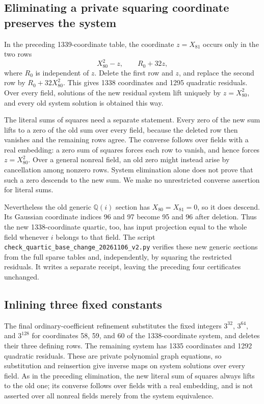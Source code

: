 \subsection{Eliminating a private squaring coordinate preserves the system}

In the preceding 1339-coordinate table, the coordinate
$z=X_{81}$ occurs only in the two rows
\[
                       X_{80}^2-z,
                         \qquad R_0+32z,
\]
where $R_0$ is independent of $z$.  Delete the first row and
$z$, and replace the second row by $R_0+32X_{80}^2$.
This gives 1338 coordinates and 1295 quadratic residuals.
Over every field, solutions of the new residual system lift
uniquely by $z=X_{80}^2$, and every old system solution is
obtained this way.

The literal sums of squares need a separate statement.
Every zero of the new sum lifts to a zero of the old sum
over every field, because the deleted row then vanishes and
the remaining rows agree.  The converse follows over fields
with a real embedding: a zero sum of squares forces each
row to vanish, and hence forces $z=X_{80}^2$.  Over a
general nonreal field, an old zero might instead arise by
cancellation among nonzero rows.  System elimination alone
does not prove that such a zero descends to the new sum.
We make no unrestricted converse assertion for literal sums.

Nevertheless the old generic $\mathbb Q(i)$ section has
$X_{80}=X_{81}=0$, so it does descend.  Its Gaussian
coordinate indices 96 and 97 become 95 and 96 after deletion.
Thus the new 1338-coordinate quartic, too, has input
projection equal to the whole field whenever $i$ belongs
to that field.  The script
\nolinkurl{check_quartic_base_change_20261106_v2.py}
verifies these new generic sections from the full sparse
tables and, independently, by squaring the restricted
residuals.  It writes a separate receipt, leaving the
preceding four certificates unchanged.

\subsection{Inlining three fixed constants}

The final ordinary-coefficient refinement substitutes the fixed
integers $3^{32}$, $3^{64}$, and $3^{128}$ for coordinates
58, 59, and 60 of the 1338-coordinate system, and deletes
their three defining rows.  The remaining system has 1335
coordinates and 1292 quadratic residuals.  These are private
polynomial graph equations, so substitution and reinsertion
give inverse maps on system solutions over every field.
As in the preceding elimination, the new literal sum of
squares always lifts to the old one; its converse follows
over fields with a real embedding, and is not asserted over
all nonreal fields merely from the system equivalence.

